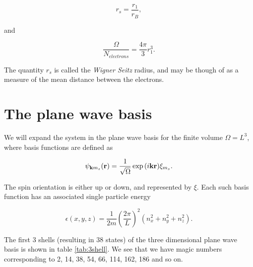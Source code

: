 \begin{equation}
r_s = \frac{r_1}{r_B},
\end{equation}

and

\begin{equation}
\frac{\Omega}{N_{electrons}} = \frac{4\pi}{3} r_1^3.
\end{equation}

The quantity $r_s$ is called the \emph{Wigner Seitz} radius, and may be though of as a measure of the mean distance between the electrons.

\section{The plane wave basis}

We will expand the system in the plane wave basis for the finite volume $\Omega = L^3$, where basis functions are defined as

\begin{equation}
\psi_{{\bf k}m_s}({\bf r})= \frac{1}{\sqrt{\Omega}}\exp{(i{\bf kr})}\xi_{m_s}.
\end{equation}

The spin orientation is either up or down, and represented by $\xi$.  Each such basis function has an associated single particle energy

\begin{equation}
\epsilon(x,y,z) = \frac{1}{2m} (\frac{2\pi}{L})^2 (n_x^2 +n_y^2 + n_z^2).
\end{equation}

The first 3 shells (resulting in 38 states) of the three dimensional plane wave basis is shown in table \ref{tab:3shell}. We see that we have magic numbers corresponding to 2, 14, 38, 54, 66, 114, 162, 186 and so on. 

